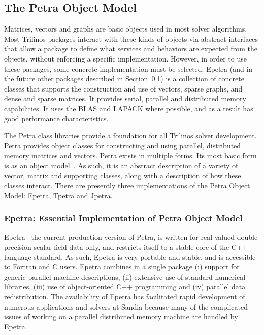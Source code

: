 \documentclass[acmtoms,acmnow]{acmtrans2m}
\begin{document}
\subsection{The Petra Object Model}
\label{subsect:PetraObjectModel}

Matrices, vectors and graphs are basic objects used in most solver
algorithms. Most Trilinos
packages interact with these kinds of objects via abstract interfaces that
allow a package to define what services and behaviors are expected from 
the objects,
without enforcing a specific implementation.  However, in order to use
these packages, some concrete
implementation must be selected.  Epetra (and in the future other 
packages described
in Section~\ref{subsect:PetraObjectModel}) is a collection of concrete
classes that supports the construction and use of vectors, sparse
graphs, and dense and sparse matrices.  It provides serial, parallel and
 distributed memory
capabilities.  It uses the BLAS and LAPACK where possible, and as a
result has good performance characteristics.

The Petra class libraries provide a
foundation for all Trilinos solver development.  Petra provides 
object classes for
constructing and using parallel, distributed memory matrices and vectors.  
Petra exists in
multiple forms.  Its most basic form is as an object 
model~\cite{HeroHoekWill2002}.
As such, it is an abstract 
description of a variety of vector, matrix and supporting classes, along with a 
description of
how these classes interact.  There are presently three implementations
of the Petra Object Model: Epetra, Tpetra and Jpetra.

\subsubsection{Epetra: Essential Implementation of Petra Object Model}

Epetra~\cite{Epetra-Ref-Guide} the current production version of Petra,
 is written for real-valued double-precision scalar field data only, and
restricts itself to a stable core
of the C++ language standard.  As such, Epetra is very portable and 
stable, and  
is accessible to Fortran and C users.  
Epetra combines in a single package (i) support 
for generic parallel
machine descriptions, (ii) extensive use of standard numerical 
libraries, (iii) use of object-oriented C++ programming and (iv) parallel data 
redistribution.  The availability of Epetra has 
facilitated rapid development
of numerous applications and solvers at Sandia because many of the 
complicated issues of
working on a parallel distributed memory machine are handled by Epetra.
\end{document}
